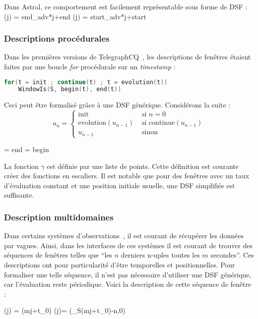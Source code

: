 Dans Astral, ce comportement est facilement représentable sous forme de DSF :
	{\beta(j) = \textrm{end\_adv}*j+\textrm{end}}
	{\alpha(j) = \textrm{start\_adv}*j+\textrm{start}}

\subsubsection{Descriptions procédurales}
Dans les premières versions de TelegraphCQ~\cite{Chandrasekaran:telegraphcq}, les descriptions de fenêtres étaient faites par une boucle \textit{for} procédurale sur un \textit{timestamp} :
\begin{lstlisting}[language=C]
for(t = init ; continue(t) ; t = evolution(t))
	WindowIs(S, begin(t), end(t))
\end{lstlisting}

Ceci peut être formalisé grâce à une DSF générique. Considérons la suite : $$u_n= \begin{cases} \mathrm{init} & \textrm{ si } n=0 \\ \mathrm{evolution}(u_{n-1}) & \textrm{ si } \mathrm{continue}(u_{n-1}) \\ u_{n-1} & \textrm{ sinon} \end{cases}$$

\DSF{\gamma(t,i) = \displaystyle\sum_{i=0}^{+\infty} u_i \indic_{[u_i, u_{i+1}[}(t)}
	{\beta = \textrm{end}}
	{\alpha = \textrm{begin}}

La fonction $\gamma$ est définie par une liste de points. Cette définition est courante créer des fonctions en escaliers. Il est notable que pour des fenêtres avec un taux d'évaluation constant et une position initiale usuelle, une DSF simplifiée est suffisante. 
\subsubsection{Description multidomaines}
Dans certains systèmes d'observations~\cite{Jurdak:sumac}, il est courant de récupérer les données par vagues. Ainsi, dans les interfaces de ces systèmes il est courant de trouver des séquences de fenêtres telles que \enquote{les $n$ derniers n-uples toutes les $m$ secondes}. Ces descriptions ont pour particularité d'être temporelles et positionnelles. Pour formaliser une telle séquence, il n'est pas nécessaire d'utiliser une DSF générique, car l'évaluation reste périodique. Voici la description de cette séquence de fenêtre :

	{\beta(j) = \rtau(mj+t_0)}
	{\alpha(j)= \max(\rtau_S(mj+t_0)-n,0)}

